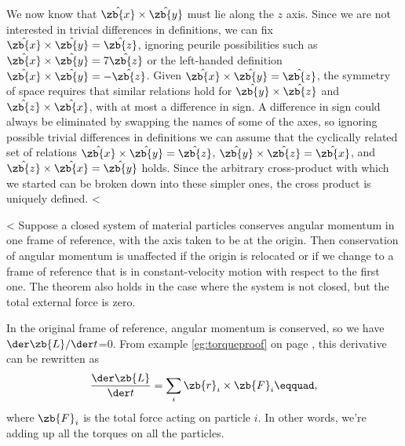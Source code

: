 We now know that $\hat{\zb{x}}\times\hat{\zb{y}}$
 must lie along the $z$ axis. Since we are
not interested in trivial differences in definitions, we can
fix $\hat{\zb{x}}\times\hat{\zb{y}}=\hat{\zb{z}}$,
ignoring peurile possibilities such as
$\hat{\zb{x}}\times\hat{\zb{y}}=7\hat{\zb{z}}$ or the
left-handed definition $\hat{\zb{x}}\times\hat{\zb{y}}=-\hat{\zb{z}}$.
Given $\hat{\zb{x}}\times\hat{\zb{y}}=\hat{\zb{z}}$, the symmetry of space
requires that similar relations hold for $\hat{\zb{y}}\times\hat{\zb{z}}$ and
$\hat{\zb{z}}\times\hat{\zb{x}}$, with at most
a difference in sign. A difference in sign could always be
eliminated by swapping the names of some of the axes, so
ignoring possible trivial differences in definitions we can
assume that the cyclically related set of relations  $\hat{\zb{x}}\times\hat{\zb{y}}=\hat{\zb{z}}$,
 $\hat{\zb{y}}\times\hat{\zb{z}}=\hat{\zb{x}}$, and  $\hat{\zb{z}}\times\hat{\zb{x}}=\hat{\zb{y}}$
holds. Since the arbitrary cross-product with which we
started can be broken down into these simpler ones, the
cross product is uniquely defined.
<%

<%
 Suppose a closed system of material particles conserves
angular momentum in one frame of reference, with the axis taken to be
at the origin. Then conservation of angular momentum is unaffected if the origin
is relocated or if we change to a frame of reference that is in constant-velocity
motion with respect to the first one. The theorem also holds in the case where the system is not
closed, but the total external force is zero.\label{choiceofaxisproof}

 In the original frame of reference, angular momentum is
conserved, so we have $\der\zb{L}/\der t$=0.
From example \ref{eg:torqueproof} on page \pageref{eg:torqueproof}, this
derivative can be rewritten as
\begin{equation*}
		\frac{\der\zb{L}}{\der t}	= \sum_i  \zb{r}_i\times\zb{F}_i\eqquad,
\end{equation*}
where $\zb{F}_i$ is the total force acting on particle $i$. In other words, we're
adding up all the torques on all the particles. 


